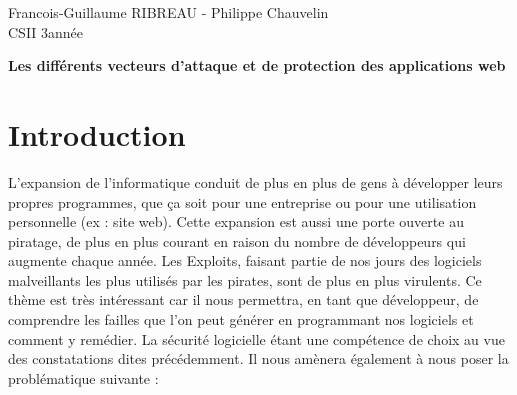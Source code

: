 \documentclass[a4paper,12pt]{report}
\title{}
\author{Francois-Guillaume RIBREAU - Philippe Chauvelin}
\date{\today}
\begin{document}
  \begin{onehalfspace}
    \begin{titlepage}
      \begin{center}
        Francois-Guillaume RIBREAU - Philippe Chauvelin\\
        CSII 3\ieme année\\
      \end{center}
      \hrulefill
      \vspace{7cm}
      \begin{center}
        \LARGE \textbf{Les différents vecteurs d'attaque et de protection des applications web}\\
        \vspace{3cm}
        \normalsize
        \vspace{5cm}
      \end{center}
    \end{titlepage}
    \clearpage

\thispagestyle{empty}
\setcounter{page}{0}
\clearpage

\setcounter{page}{1}
\thispagestyle{empty}
\clearpage

\chapter*{Introduction} %





L’expansion de l’informatique conduit de plus en plus de gens à développer leurs propres programmes, que ça soit pour une entreprise ou pour une utilisation personnelle (ex : site web). Cette expansion est aussi une porte ouverte au piratage, de plus en plus courant en raison du nombre de développeurs qui augmente chaque année. Les Exploits, faisant partie de nos jours des logiciels malveillants les plus utilisés par les pirates, sont de plus en plus virulents.
Ce thème est très intéressant car il nous permettra, en tant que développeur, de comprendre les failles que l’on peut générer en programmant nos logiciels et comment y remédier. La sécurité logicielle étant une compétence de choix au vue des constatations dites précédemment. Il nous amènera également à nous poser la problématique suivante :


\end{onehalfspace}
\end{document}
